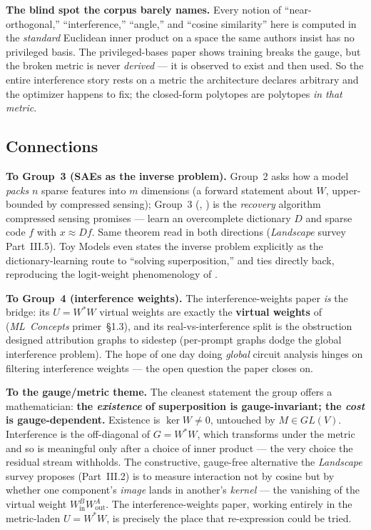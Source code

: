 \textbf{The blind spot the corpus barely names.} Every notion of ``near-orthogonal,'' ``interference,'' ``angle,'' and ``cosine similarity'' here is computed in the \emph{standard} Euclidean inner product on a space the same authors insist has no privileged basis. The privileged-bases paper shows training breaks the gauge, but the broken metric is never \emph{derived} --- it is observed to exist and then used. So the entire interference story rests on a metric the architecture declares arbitrary and the optimizer happens to fix; the closed-form polytopes are polytopes \emph{in that metric}.


\subsection*{Connections}

\textbf{To Group~3 (SAEs as the inverse problem).} Group~2 asks how a model \emph{packs} $n$ sparse features into $m$ dimensions (a forward statement about $W$, upper-bounded by compressed sensing); Group~3 (\textcite{towards-monosemanticity}, \textcite{scaling-monosemanticity}) is the \emph{recovery} algorithm compressed sensing promises --- learn an overcomplete dictionary $D$ and sparse code $f$ with $x \approx Df$. Same theorem read in both directions (\emph{Landscape} survey Part~III.5). Toy Models even states the inverse problem explicitly as the dictionary-learning route to ``solving superposition,'' and \textcite{toy-model-of-interference-weights} ties directly back, reproducing the logit-weight phenomenology of \textcite{towards-monosemanticity}.

\textbf{To Group~4 (interference weights).} The interference-weights paper \emph{is} the bridge: its $U = W^{*}W$ virtual weights are exactly the \textbf{virtual weights} of \textcite{framework} (\emph{ML~Concepts} primer~\S1.3), and its real-vs-interference split is the obstruction \textcite{circuit-tracing-computational-graphs} designed attribution graphs to sidestep (per-prompt graphs dodge the global interference problem). The hope of one day doing \emph{global} circuit analysis hinges on filtering interference weights --- the open question the paper closes on.

\textbf{To the gauge/metric theme.} The cleanest statement the group offers a mathematician: \textbf{the \emph{existence} of superposition is gauge-invariant; the \emph{cost} is gauge-dependent.} Existence is $\ker W \ne 0$, untouched by $M \in GL(V)$. Interference is the off-diagonal of $G = W^{*}W$, which transforms under the metric and so is meaningful only after a choice of inner product --- the very choice the residual stream withholds. The constructive, gauge-free alternative the \emph{Landscape} survey proposes (Part~III.2) is to measure interaction not by cosine but by whether one component's \emph{image} lands in another's \emph{kernel} --- the vanishing of the virtual weight $W_{\text{in}}^B W_{\text{out}}^A$. The interference-weights paper, working entirely in the metric-laden $U = W^{*}W$, is precisely the place that re-expression could be tried.


